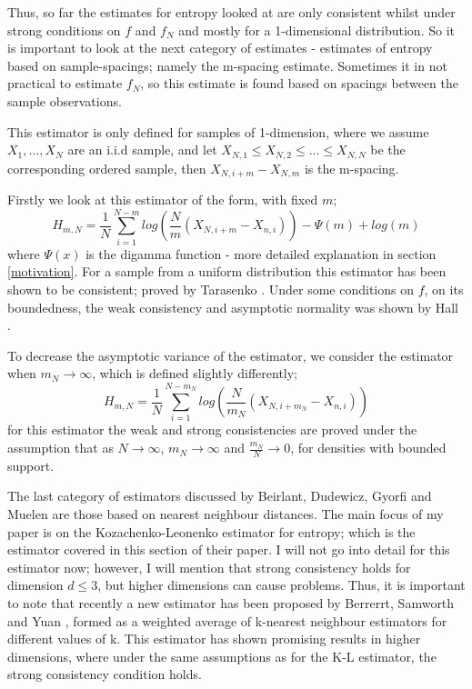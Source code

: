 \documentclass{report}
\begin{document}
Thus, so far the estimates for entropy looked at are only consistent whilst under strong conditions on $f$ and $f_{N}$ and mostly for a 1-dimensional distribution. So it is important to look at the next category of estimates - estimates of entropy based on sample-spacings; namely the m-spacing estimate. Sometimes it in not practical to estimate $f_{N}$, so this estimate is found based on spacings between the sample observations. 

This estimator is only defined for samples of 1-dimension, where we assume $X_{1}, ..., X_{N}$ are an i.i.d sample, and let $X_{N, 1} \leq X_{N, 2} \leq ... \leq X_{N, N}$ be the corresponding ordered sample, then $X_{N, i+m} - X_{N, m}$ is the m-spacing.

Firstly we look at this estimator of the form, with fixed $m$;
\begin{equation}
H_{m, N} = \frac{1}{N} \sum_{i=1}^{N-m} log \left(\frac{N}{m} (X_{N, i+m} - X_{n, i}) \right) - \Psi(m) + log(m)
\end{equation}
where $\Psi(x)$ is the digamma function - more detailed explanation in section \ref{motivation}. For a sample from a uniform distribution this estimator has been shown to be consistent; proved by Tarasenko \cite{spacest1}. Under some conditions on $f$, on its boundedness, the weak consistency and asymptotic normality was shown by Hall \cite{spacest2}.

To decrease the asymptotic variance of the estimator, we consider the estimator when $m_{N} \to \infty$, which is defined slightly differently;
\begin{equation}
H_{m, N} = \frac{1}{N} \sum_{i=1}^{N-m_{N}} log \left(\frac{N}{m_{N}} (X_{N, i+m_{N}} - X_{n, i}) \right)
\end{equation}
for this estimator the weak and strong consistencies are proved under the assumption that as $N \to \infty$, $m_{N} \to \infty$ and $\frac{m_{N}}{N} \to 0$, for densities with bounded support.

The last category of estimators discussed by Beirlant, Dudewicz, Gyorfi and Muelen are those based on nearest neighbour distances. The main focus of my paper is on the Kozachenko-Leonenko estimator for entropy; which is the estimator covered in this section of their paper. I will not go into detail for this estimator now; however, I will mention that strong consistency holds for dimension $d \leq 3$, but higher dimensions can cause problems. Thus, it is important to note that recently a new estimator has been proposed by Berrerrt, Samworth and Yuan \cite{paper4}, formed as a weighted average of k-nearest neighbour estimators for different values of k. This estimator has shown promising results in higher dimensions, where under the same assumptions as for the K-L estimator, the strong consistency condition holds.
\end{document}
